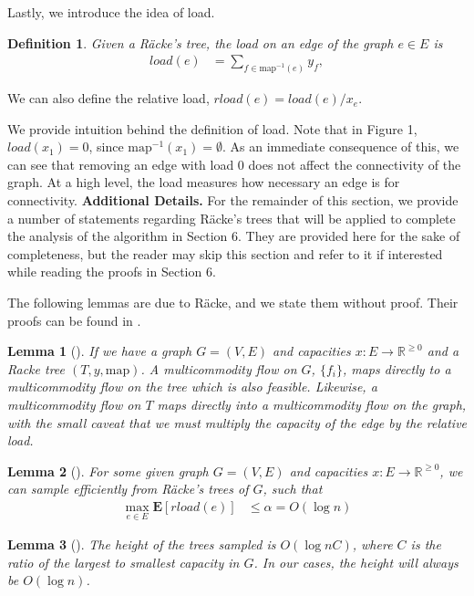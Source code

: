 \documentclass[12pt]{article}
\newtheorem{definition}{Definition}
\newtheorem{lemma}{Lemma}
\begin{document}
Lastly, we introduce the idea of load.

\begin{definition}
Given a R\"{a}cke's tree, the load on an edge of the graph $e \in E$ is
\begin{align}
load(e) &= \sum_{f \in \text{map}^{-1}(e)} y_f,
\end{align}
\end{definition}
We can also define the relative load, $rload(e) = load(e)/x_e$.

We provide intuition behind the definition of load. Note that in Figure 1, $load(x_1) = 0$, since $\mathrm{map}^{-1}(x_1) = \emptyset$. As an immediate consequence of this, we can see that removing an edge with load 0 does not affect the connectivity of the graph. At a high level, the load measures how necessary an edge is for connectivity. 
\noindent \textbf{Additional Details.} For the remainder of this section, we provide a number of statements regarding R\"{a}cke's trees that will be applied to complete the analysis of the algorithm in Section 6. They are provided here for the sake of completeness, but the reader may skip this section and refer to it if interested while reading the proofs in Section 6.

The following lemmas are due to R\"{a}cke, and we state them without proof. Their proofs can be found in \cite{racke}.

\begin{lemma}[\cite{racke}]
\label{lem:mapflows}
If we have a graph $G = (V, E)$ and capacities $x: E \rightarrow \mathbb{R}^{\geq 0}$ and a Racke tree $(T, y, \text{map})$. A multicommodity flow on $G$, $\{ f_i \}$, maps directly to a multicommodity flow on the tree which is also feasible. Likewise, a multicommodity flow on $T$ maps directly into a multicommodity flow on the graph, with the small caveat that we must multiply the capacity of the edge by the relative load. 
\end{lemma}

\begin{lemma}[\cite{racke}]
\label{lem:rload}
For some given graph $G = (V, E)$ and capacities $x: E \rightarrow \mathbb{R}^{\geq 0}$, we can sample efficiently from R\"{a}cke's trees of $G$, such that 
\begin{align}
\max_{e \in E} \textbf{E}[rload(e)] &\leq \alpha = O(\log n) 
\end{align}
\end{lemma}

\begin{lemma}[\cite{ssc}]
\label{thm:height}
The height of the trees sampled is $O(\log nC)$, where $C$ is the ratio of the largest to smallest capacity in $G$. In our cases, the height will always be $O(\log n)$. 
\end{lemma}
\end{document}
